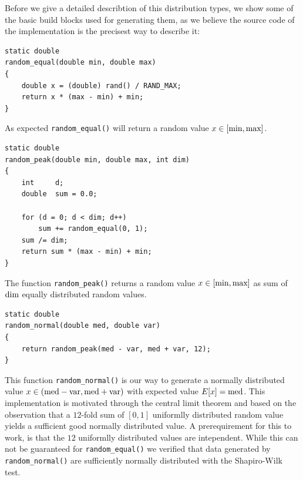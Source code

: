 
Before we give a detailed describtion of this distribution types, we
show some of the basic build blocks used for generating them, as we
believe the source code of the implementation is the precisest way to
describe it:

\begin{lstlisting}
static double
random_equal(double min, double max)
{
	double x = (double) rand() / RAND_MAX;
	return x * (max - min) + min;
}
\end{lstlisting}

As expected \lstinline{random_equal()} will return a random value $x
\in [\textnormal{min}, \textnormal{max}]$.

\begin{lstlisting}
static double
random_peak(double min, double max, int dim)
{
	int		d;
	double	sum = 0.0;

	for (d = 0; d < dim; d++)
		sum += random_equal(0, 1);
	sum /= dim;
	return sum * (max - min) + min;
}
\end{lstlisting}

The function \lstinline{random_peak()} returns a random value $x \in
[\textnormal{min}, \textnormal{max}]$ as sum of $\textnormal{dim}$
equally distributed random values.

\begin{lstlisting}
static double
random_normal(double med, double var)
{
	return random_peak(med - var, med + var, 12);
}
\end{lstlisting}

This function \lstinline{random_normal()} is our way to generate a
normally distributed value $x \in (\textnormal{med} -
\textnormal{var}, \textnormal{med} + \textnormal{var})$ with expected
value $E[x] = \textnormal{med}$.
%
This implementation is motivated through the central limit theorem and
based on the observation that a $12$-fold sum of $[0,1]$ uniformlly
distributed random value yields a sufficient good normally distributed
value. A prerequirement for this to work, is that the $12$ uniformlly
distributed values are intependent. While this can not be guaranteed
for \lstinline{random_equal()} we verified that data generated by
\lstinline{random_normal()} are sufficiently normally distributed with
the Shapiro-Wilk test.

